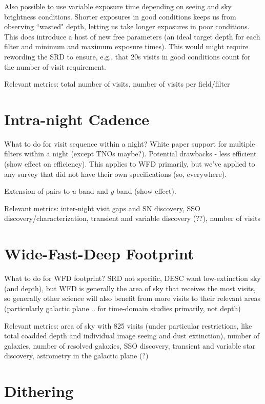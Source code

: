 Also possible to use variable exposure time depending on seeing and sky brightness conditions. Shorter exposures in good conditions keeps us from observing ``wasted" depth, letting us take longer exposures in poor conditions. This does introduce a host of new free parameters (an ideal target depth for each filter and minimum and maximum exposure times).  This would might require rewording the SRD to ensure, e.g., that 20s visits in good conditions count for the number of visit requirement.

Relevant metrics: total number of visits, number of visits per field/filter

\section{Intra-night Cadence}
What to do for visit sequence within a night? White paper support for multiple filters within a night (except TNOs maybe?). Potential drawbacks - less efficient (show effect on efficiency). This applies to WFD primarily, but we've applied to any survey that did not have their own specifications (so, everywhere). 

Extension of pairs to $u$ band and $y$ band (show effect). 

Relevant metrics: inter-night visit gaps and SN discovery, SSO discovery/characterization, transient and variable discovery (??), number of visits

\section{Wide-Fast-Deep Footprint}
What to do for WFD footprint? SRD not specific, DESC want low-extinction sky (and depth), but WFD is generally the area of sky that receives the most visits, so generally other science will also benefit from more visits to their relevant areas (particularly galactic plane .. for time-domain studies primarily, not depth)

Relevant metrics: area of sky with 825 visits (under particular restrictions, like total coadded depth and individual image seeing and dust extinction), number of galaxies, number of resolved galaxies, SSO discovery, transient and variable star discovery, astrometry in the galactic plane (?)

\section{Dithering}

